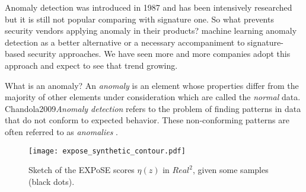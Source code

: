 Anomaly detection was introduced in 1987 and has been intensively researched but it is still not popular comparing with signature one. So what prevents security vendors applying anomaly in their products? machine learning anomaly detection as a better alternative or a necessary accompaniment to signature-based security approaches. We have seen more and more companies adopt this approach and expect to see that trend growing.

























































\iffalse
What is an anomaly? An \emph{anomaly} is an element whose properties differ from the majority of other elements under consideration which are called the \emph{normal} data. {Chandola2009}{\emph{Anomaly detection} refers to the problem of finding patterns in data that do not conform to expected behavior. These non-conforming patterns are often referred to as \emph{anomalies} \textelp{}}.

    \begin{figure}[tb]
    	\centering
    	\texttt{[image: expose\_synthetic\_contour.pdf]}
    	\caption{Sketch of the EXPoSE scores $\eta(z)$ in $Real^2$, given some samples (black dots).}
    	\label{fig:expose_synthetic_contour}
    \end{figure}
    
